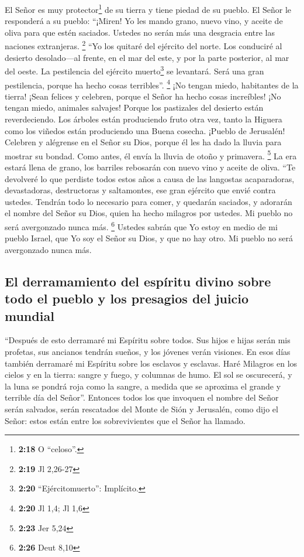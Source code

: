  El Señor es muy protector\footnote{\textbf{2:18} O
  ``celoso''.} de su tierra y tiene piedad de su pueblo. 
El Señor le responderá a su pueblo: ``¡Miren! Yo les mando grano, nuevo
vino, y aceite de oliva para que estén saciados. Ustedes no serán más
una desgracia entre las naciones extranjeras. \footnote{\textbf{2:19} Jl
  2,26-27}  ``Yo los quitaré del ejército del norte. Los
conduciré al desierto desolado---al frente, en el mar del este, y por la
parte posterior, al mar del oeste. La pestilencia del ejército
muerto\footnote{\textbf{2:20} ``Ejércitomuerto'': Implícito.} se
levantará. Será una gran pestilencia, porque ha hecho cosas terribles''.
\footnote{\textbf{2:20} Jl 1,4; Jl 1,6}  ¡No tengan
miedo, habitantes de la tierra! ¡Sean felices y celebren, porque el
Señor ha hecho cosas increíbles!  ¡No tengan miedo,
animales salvajes! Porque los pastizales del desierto están
reverdeciendo. Los árboles están produciendo fruto otra vez, tanto la
Higuera como los viñedos están produciendo una Buena cosecha.
 ¡Pueblo de Jerusalén! Celebren y alégrense en el Señor
su Dios, porque él les ha dado la lluvia para mostrar su bondad. Como
antes, él envía la lluvia de otoño y primavera. \footnote{\textbf{2:23}
  Jer 5,24}  La era estará llena de grano, los barriles
rebosarán con nuevo vino y aceite de oliva.  ``Te
devolveré lo que perdiste todos estos años a causa de las langostas
acaparadoras, devastadoras, destructoras y saltamontes, ese gran
ejército que envié contra ustedes.  Tendrán todo lo
necesario para comer, y quedarán saciados, y adorarán el nombre del
Señor su Dios, quien ha hecho milagros por ustedes. Mi pueblo no será
avergonzado nunca más. \footnote{\textbf{2:26} Deut 8,10}
 Ustedes sabrán que Yo estoy en medio de mi pueblo
Israel, que Yo soy el Señor su Dios, y que no hay otro. Mi pueblo no
será avergonzado nunca más.

\hypertarget{el-derramamiento-del-espuxedritu-divino-sobre-todo-el-pueblo-y-los-presagios-del-juicio-mundial}{%
\subsection{El derramamiento del espíritu divino sobre todo el pueblo y
los presagios del juicio
mundial}\label{el-derramamiento-del-espuxedritu-divino-sobre-todo-el-pueblo-y-los-presagios-del-juicio-mundial}}

 ``Después de esto derramaré mi Espíritu sobre todos. Sus
hijos e hijas serán mis profetas, sus ancianos tendrán sueños, y los
jóvenes verán visiones.  En esos días también derramaré
mi Espíritu sobre los esclavos y esclavas.  Haré Milagros
en los cielos y en la tierra: sangre y fuego, y columnas de humo.
 El sol se oscurecerá, y la luna se pondrá roja como la
sangre, a medida que se aproxima el grande y terrible día del Señor''.
 Entonces todos los que invoquen el nombre del Señor
serán salvados, serán rescatados del Monte de Sión y Jerusalén, como
dijo el Señor: estos están entre los sobrevivientes que el Señor ha
llamado.


